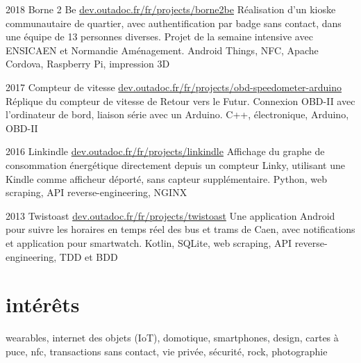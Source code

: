 \documentclass[]{friggeri-cv}
\begin{document}
\begin{entrylist}
	\entry
	{2018}
	{Borne 2 Be}
	{\href{https://dev.outadoc.fr/fr/projects/borne2be}{dev.outadoc.fr/fr/projects/borne2be}}
	{Réalisation d'un kioske communautaire de quartier, avec authentification par badge sans contact, dans une équipe de 13 personnes diverses. Projet de la semaine intensive avec ENSICAEN et Normandie Aménagement.}
	{Android Things, NFC, Apache Cordova, Raspberry Pi, impression 3D}
	
	\entry
	{2017}
	{Compteur de vitesse}
	{\href{https://dev.outadoc.fr/fr/projects/obd-speedometer-arduino}{dev.outadoc.fr/fr/projects/obd-speedometer-arduino}}
	{Réplique du compteur de vitesse de Retour vers le Futur. Connexion OBD-II avec l'ordinateur de bord, liaison série avec un Arduino.}
	{C++, électronique, Arduino, OBD-II}
	
	\entry
	{2016}
	{Linkindle}
	{\href{https://dev.outadoc.fr/fr/projects/linkindle}{dev.outadoc.fr/fr/projects/linkindle}}
	{Affichage du graphe de consommation énergétique directement depuis un compteur Linky, utilisant une Kindle comme afficheur déporté, sans capteur supplémentaire.}
	{Python, web scraping, API reverse-engineering, NGINX}
    
    \entry
    {2013}
    {Twistoast}
    {\href{https://dev.outadoc.fr/fr/projects/twistoast}{dev.outadoc.fr/fr/projects/twistoast}}
    {Une application Android pour suivre les horaires en temps réel des bus et trams de Caen, avec notifications et application pour smartwatch.}
    {Kotlin, SQLite, web scraping, API reverse-engineering, TDD et BDD}
\end{entrylist}

\section{intérêts}

wearables, internet des objets (IoT), domotique, smartphones, design, cartes à puce, nfc, transactions sans contact, vie privée, sécurité, rock, photographie
\end{document}
